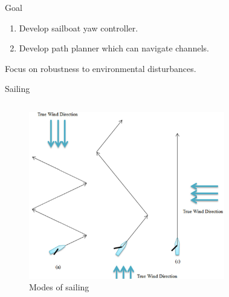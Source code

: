 \documentclass[10pt,xcolor={table,dvipsnames},t]{beamer}
\begin{document}
\begin{frame}{Goal}

\begin{enumerate}
    \item Develop sailboat yaw controller.
    \item Develop path planner which can navigate channels.
\end{enumerate}
Focus on robustness to environmental disturbances.

\end{frame}
  

\begin{frame}{Sailing}
\begin{columns}

\begin{figure}
    \centering
    \includegraphics[width=\linewidth]{documents/figures/alves_modes.png}
    \caption{Modes of sailing \cite{Alves2010}}
    \label{fig:alves_modes}
\end{figure}
\begin{figure}
    \centering

\end{figure}
\end{columns}
\end{frame}
\end{document}

